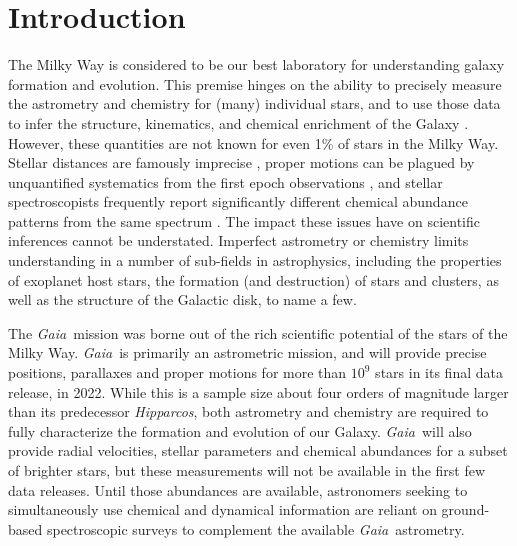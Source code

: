 \documentclass[preprint,trackchanges]{aastex}
\newcommand{\project}[1]{\textsl{#1}}
\newcommand{\gaia}{\project{Gaia}}
\newcommand{\hipparcos}{\project{Hipparcos}}
\begin{document}
\keywords{\vspace{5em}}



\section{Introduction} 
\label{sec:introduction}

The Milky Way is considered to be our best laboratory for understanding galaxy
formation and evolution.  This premise hinges on the ability to precisely measure 
the astrometry and chemistry for (many) individual stars, and to use those data 
to infer the structure, kinematics, and chemical enrichment of the Galaxy 
\citep[e.g.,][]{Schlaufman_2009,Deason_2011,Ness_2012,Ness_2013a,Ness_2013b,
Casey_2012,Casey_2013,Casey_2014a,Casey_2014b,Kordopatis_2015,Bovy_2016}.  
However, these quantities are not known for even 1\% of stars in the Milky Way.  
Stellar distances are famously imprecise \citep[e.g.,][]{van_Leeuwen_2007,
Jofre_2015,Madler_2016}, proper motions can be plagued by unquantified systematics 
from the first epoch observations \citep[e.g.,][]{Casey_Schlaufman_2015}, and 
stellar spectroscopists frequently report significantly different chemical 
abundance patterns from the same spectrum \citep{Smiljanic_2014}.  The impact 
these issues have on scientific inferences cannot be understated.  Imperfect 
astrometry or chemistry limits understanding in a number of sub-fields in
astrophysics, including the properties of exoplanet host stars, the formation 
(and destruction) of stars and clusters, as well as the structure of the 
Galactic disk, to name a few.


The \gaia\ mission was borne out of the rich scientific potential of the stars of the Milky Way. 
\gaia\ is primarily an astrometric mission, and will provide precise positions,
parallaxes and proper motions for more than $10^9$ stars in its final data
release, in 2022.  While this is a sample size about four orders of magnitude 
larger than its predecessor \hipparcos, both astrometry and chemistry are 
required to fully characterize the formation and evolution of our Galaxy. 
\gaia\ will also provide radial velocities, stellar parameters and chemical 
abundances for a subset of brighter stars, but these measurements will not be 
available in the first few data releases. Until those abundances are available,
astronomers seeking to simultaneously use chemical and dynamical information are
reliant on ground-based spectroscopic surveys to complement the available 
\gaia\ astrometry.
\end{document}
